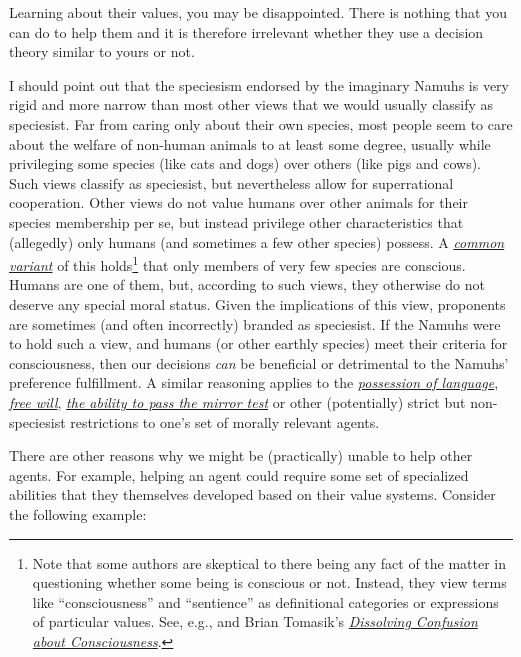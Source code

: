 Learning about their values, you may be disappointed. There is nothing
that you can do to help them and it is therefore irrelevant whether they
use a decision theory similar to yours or not.

I should point out that the speciesism endorsed by the imaginary Namuhs
is very rigid and more narrow than most other views that we would
usually classify as speciesist. Far from caring only about their own
species, most people seem to care about the welfare of non-human animals
to at least some degree, usually while privileging some species (like
cats and dogs) over others (like pigs and cows). Such views classify as
speciesist, but nevertheless allow for superrational cooperation. Other
views do not value humans over other animals for their species
membership per se, but instead privilege other characteristics that
(allegedly) only humans (and sometimes a few other species) possess. A
\href{https://en.wikipedia.org/wiki/Animal_consciousness\#Philosophical_background}{\emph{common
variant}} of this holds\footnote{Note that some authors are skeptical to
  there being any fact of the matter in questioning whether some being
  is conscious or not. Instead, they view terms like ``consciousness''
  and ``sentience'' as definitional categories or expressions of
  particular values. See, e.g., \parencite{Dennett1991-es}
  and Brian Tomasik's
  \href{http://reducing-suffering.org/dissolving-confusion-about-consciousness/}{\emph{\emph{Dissolving
  Confusion about Consciousness}}}.} that only members of very few
species are conscious. Humans are one of them, but, according to such
views, they otherwise do not deserve any special moral status. Given the
implications of this view, proponents are sometimes (and often
incorrectly) branded as speciesist. If the Namuhs were to hold such a
view, and humans (or other earthly species) meet their criteria for
consciousness, then our decisions \emph{can} be beneficial or
detrimental to the Namuhs' preference fulfillment. A similar reasoning
applies to the
\href{https://en.wikipedia.org/wiki/Animal_consciousness\#Language}{\emph{possession
of language}}, \href{https://en.wikipedia.org/wiki/Free_will}{\emph{free
will}},
\href{https://en.wikipedia.org/wiki/Animal_consciousness\#Mirror_test}{\emph{the
ability to pass the mirror test}} or other (potentially) strict but
non-speciesist restrictions to one's set of morally relevant agents.

There are other reasons why we might be (practically) unable to help
other agents. For example, helping an agent could require some set of
specialized abilities that they themselves developed based on their
value systems. Consider the following example:

